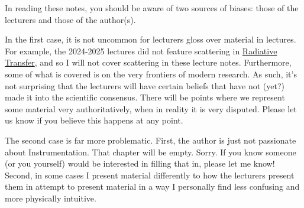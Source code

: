 \documentclass[a4paper,11pt]{report}
\begin{document}
\begin{sloppypar}
\begin{comment}
  Despite the vast diversity in C5, there are a few common themes (which are by no means unique to C5) that pop up throughout the course. I'll try to flag them clearly so that the reader can hopefully experience some kind of continuity when studying this course.  I have in mind three key themes:
  \begin{enumerate}
      \item The Role of \textbf{Scales}: The atmospheres and oceans are complex systems consisting of various phenomena on multiple spatio-temporal scales. At times we will exploit this by either a) noting empirical facts regarding the spatio-temporal scale of a phenomenon, or b) specifying a spatio-temporal scale to focus on a phenomenon.
      \item The Role of \textbf{Assumptions}: We'll make many assumptions throughout this course to simplify and solve the equations governing the phenomena under consideration. It's worth always keeping in mind the validity of this assumption, and why we make it. Sometimes, we make an assumptions simply for teaching purposes: real climate models numerically integrate this. Other times, the assumption. Sometimes assumptions are valid not simply due to luck but due to dynamical reasons that force it to be the case.
      \item A 3rd theme idk lol:
  \end{enumerate}
\end{comment}

In reading these notes, you should be aware of two sources of biases: those of the lecturers and those of the author(s).

In the first case, it is not uncommon for lecturers gloss over material in lectures. For example, the 2024-2025 lectures did not feature scattering in \hyperref[Radiative Transfer]{Radiative Transfer}, and so I will not cover scattering in these lecture notes. Furthermore, some of what is covered is on the very frontiers of modern research. As such, it's not surprising that the lecturers will have certain beliefs that have not (yet?) made it into the scientific consensus. There will be points where we represent some material very authoritatively, when in reality it is very disputed. Please let us know if you believe this happens at any point.

The second case is far more problematic. First, the author is just not passionate about Instrumentation. That chapter will be empty. Sorry. If you know someone (or you yourself) would be interested in filling that in, please let me know! Second, in some cases I present material differently to how the lecturers present them in attempt to present material in a way I personally find less confusing and more physically intuitive. 


\end{sloppypar}
\end{document}
